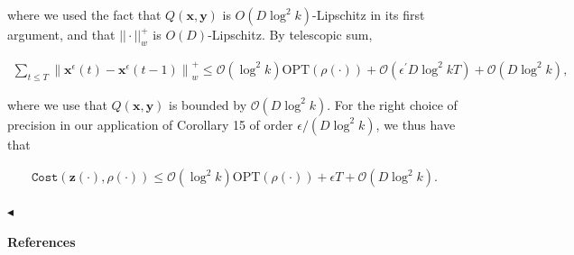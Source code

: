 \documentclass[10pt,a4paper]{article}
\begin{document}
where we used the fact that $Q({\boldsymbol{x}},{\boldsymbol{y}})$ is $O(D\log^{2}k)$-Lipschitz in its first argument, and that $||\cdot||_{w}^{+}$ is $O(D)$-Lipschitz. By telescopic sum,\par


\[\begin{gathered}
\displaystyle\sum_{t\leq T}\left\|{\boldsymbol{x}}^{\epsilon}(t)-{\boldsymbol{x}}^{\epsilon}(t-1)\right\|_{w}^{+}\leq\mathcal{O}(\log^{2}k){\text{OPT}}(\rho(\cdot))+\mathcal{O}(\epsilon^{\prime}D\log^{2}kT)+\mathcal{O}(D\log^{2}k),
\end{gathered}\]


where we use that $Q({\boldsymbol{x}},{\boldsymbol{y}})$ is bounded by $\mathcal{O}(D\log^{2}k)$. For the right choice of precision in our application of Corollary 15 of order $\epsilon/(D\log^{2}k)$, we thus have that\par


\[\begin{gathered}
\displaystyle{\texttt{Cost}}({\mathbf{z}}(\cdot),\rho(\cdot))\leq\mathcal{O}(\log^{2}k){\text{OPT}}(\rho(\cdot))+\epsilon T+\mathcal{O}(D\log^{2}k).
\end{gathered}\]


$\blacktriangleleft$\par






\par\medskip\noindent\textbf{References}\par
\end{document}
